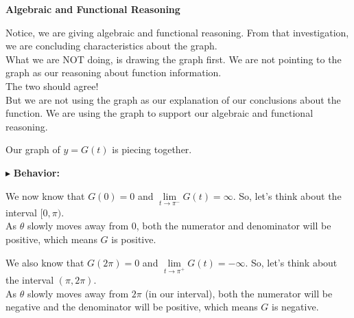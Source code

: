 \documentclass{ximera}
\begin{document}
\begin{warning} \textbf{\textcolor{red!80!black}{Algebraic and Functional Reasoning}}


Notice, we are giving algebraic and functional reasoning.  From that investigation, we are concluding characteristics about the graph. \\

What we are NOT doing, is drawing the graph first.  We are not pointing to the graph as our reasoning about function information. \\


The two should agree!  \\

But we are not using the graph as our explanation of our conclusions about the function.  We are using the graph to support our algebraic and functional reasoning.


\end{warning}









Our graph of $y=G(t)$ is piecing together.








$\blacktriangleright$ \textbf{\textcolor{blue!55!black}{Behavior: }}  



We now know that $G(0) = 0$ and  $\lim\limits_{t \to \pi^{-}}G(t) = \infty$.  So, let's think about the interval $[0, \pi)$. \\


As $\theta$ slowly moves away from $0$, both the numerator and denominator will be positive, which means $G$ is positive.
 



We also know that $G(2\pi) = 0$ and  $\lim\limits_{t \to \pi^{+}}G(t) = -\infty$.  So, let's think about the interval $(\pi, 2\pi)$. \\


As $\theta$ slowly moves away from $2\pi$ (in our interval), both the numerator will be negative and the denominator will be positive, which means $G$ is negative.
\end{document}
